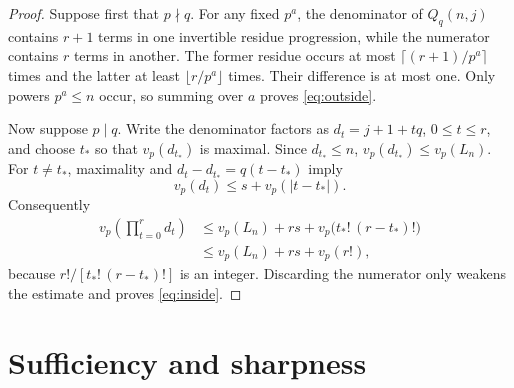 \documentclass[11pt]{article}
\theoremstyle{remark}
\begin{document}
\begin{proof}
Suppose first that $p\nmid q$.  For any fixed $p^a$, the denominator of
$Q_q(n,j)$ contains $r+1$ terms in one invertible residue progression, while
the numerator contains $r$ terms in another.  The former residue occurs at
most $\lceil(r+1)/p^a\rceil$ times and the latter at least
$\lfloor r/p^a\rfloor$ times.  Their difference is at most one.  Only powers
$p^a\le n$ occur, so summing over $a$ proves \eqref{eq:outside}.

Now suppose $p\mid q$.  Write the denominator factors as
$d_t=j+1+tq$, $0\le t\le r$, and choose $t_*$ so that $v_p(d_{t_*})$
is maximal.  Since $d_{t_*}\le n$,
$v_p(d_{t_*})\le v_p(L_n)$.  For $t\ne t_*$, maximality and
$d_t-d_{t_*}=q(t-t_*)$ imply
\[
 v_p(d_t)\le s+v_p(|t-t_*|).
\]
Consequently
\begin{align*}
 v_p\left(\prod_{t=0}^r d_t\right)
 &\le v_p(L_n)+rs+v_p\bigl(t_*!\,(r-t_*)!\bigr)\\
 &\le v_p(L_n)+rs+v_p(r!),
\end{align*}
because $r!/[t_*!\,(r-t_*)!]$ is an integer.  Discarding the numerator only
weakens the estimate and proves \eqref{eq:inside}.
\end{proof}

\section{Sufficiency and sharpness}
\end{document}
